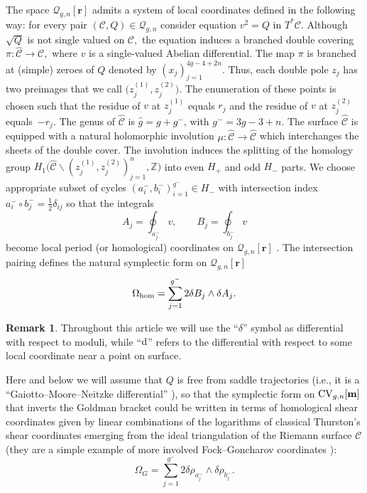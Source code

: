 \documentclass[pdftex]{sigma}
\numberwithin{equation}{section}
\theoremstyle{definition}
\newtheorem{Remark}[Theorem]{Remark}
\newcommand{\Z}{\mathbb{Z}}
\begin{document}
The space $\mathcal{Q}_{g,n}[\mathbf{r}]$ admits a system of local coordinates defined in the following way: for every pair $( \mathcal{C}, Q) \in \mathcal{Q}_{g,n} $ consider equation $v^2=Q$ in $T^*\mathcal{C}.$ Although $\sqrt{Q}$ is not single valued on $\mathcal{C},$ the equation induces a branched double covering $\pi\colon \hat{\mathcal{C}} \xrightarrow{} \mathcal{C},$ where $v$ is a single-valued Abelian differential. The map $\pi$ is branched at (simple) zeroes of $Q$ denoted by $(x_j)^{4g-4+2n}_{j=1}$. Thus, each double pole $z_j$ has two preimages that we call $\big(z_j^{(1)}, z_j^{(2)}\big)$. The enumeration of these points is chosen
such that the residue of $v$ at $z_j^{(1)}$
equals $r_j$ and the residue of $v$ at $z_j^{(2)}$
equals~$-r_j$. The genus of $\hat{\mathcal{C}}$ is $\hat{g}=g+g^-$, with $g^-=3g-3+n.$ The surface $\hat{\mathcal{C}}$ is equipped with a natural holomorphic involution $\mu\colon \hat{\mathcal{C}} \xrightarrow{} \hat{\mathcal{C}}$ which interchanges the sheets of the double cover. The involution induces the splitting of the homology group $H_1\big(\hat{\mathcal{C}}\backslash (z_j^{(1)}, z_j^{(2)})^{n}_{j=1}, \Z\big)$ into even $H_+$ and odd $H_-$ parts. We choose appropriate subset of cycles $(a^-_i,b^-_i)^{g^-}_{i=1} \in H_-$ with intersection index $a^-_i \circ b^-_j=\frac{1}{2}\delta_{ij}$ so that the integrals
\begin{equation*}%
A_j=\oint_{a^-_j}v, \qquad B_j=\oint_{b^-_j}v
\end{equation*}
become local period (or homological) coordinates on $\mathcal{Q}_{g,n}[\mathbf{r}]$ \cite{Kontsevich_2003}. The intersection pairing defines the natural symplectic form on $\mathcal{Q}_{g,n}[\mathbf{r}]$
\begin{equation*}%
\Omega_{{\rm hom}}=\sum^{g^-}_{j=1}2 \delta B_j \wedge \delta A_j.
\end{equation*}
\begin{Remark}

Throughout this article we will use the ``$\delta$'' symbol as differential with respect to moduli, while ``${\rm d}$'' refers to the differential with respect to some local coordinate near a point on surface.
\end{Remark}
Here and below we will assume that $Q$ is free from saddle trajectories (i.e., it is a ``Gaiotto--Moore--Neitzke differential'' \cite{giatto}), so that the symplectic form on ${\rm CV}_{g,n}[\mathbf{m}]$ that inverts the Goldman bracket could be written in terms of homological shear coordinates given by linear combinations of the logarithms of classical Thurston's shear coordinates \cite{thurston} emerging from the ideal triangulation of the Riemann surface $\mathcal{C}$ (they are a simple example of more involved Fock--Goncharov coordinates \cite{fock}):
\begin{equation}\label{11}\Omega_{G}=\sum^{g^-}_{j=1} 2 \delta\rho_{a^-_j} \wedge \delta\rho_{b^-_j}.\end{equation}
\end{document}
